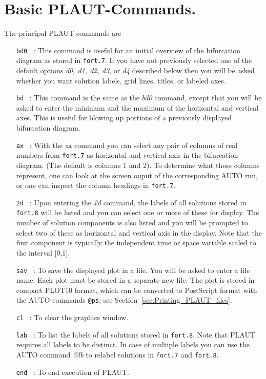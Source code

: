 \documentclass[12pt]{report}
\begin{document}
\section{ Basic {\cal PLAUT}-Commands.} \label{sec:main_PLAUT_commands}
The principal {\cal PLAUT}-commands are 
\begin{itemize}
\item[\tt bd0]~:
  This command is useful for an initial overview of the bifurcation
  diagram as stored in {\tt fort.7}.
  If you have not previously selected one of the default options 
  {\it d0, d1, d2, d3}, or {\it d4} described below then you will be asked
  whether you want solution labels, grid lines, titles, or labeled axes.

\item[\tt bd]~:
  This command is the same as the {\it bd0} command, except that you will be
  asked to enter the minimum and the maximum of the horizontal and 
  vertical axes.
  This is useful for blowing up portions of a previously displayed
  bifurcation diagram.

\item[\tt ax]~:
  With the {\it ax} command you can select any pair of columns of real
  numbers from {\tt fort.7} as horizontal and vertical axis in the
  bifurcation diagram. (The default is columns 1 and 2).
  To determine what these columns represent, one can look at the
  screen ouput of the corresponding {\cal AUTO} run, or one can inspect the
  column headings in {\tt fort.7}.
  
\item[\tt 2d]~:
  Upon entering the {\it 2d} command, the labels of all solutions stored 
  in {\tt fort.8} will be listed and you can select one or more of these 
  for display. The number of solution components is also listed
  and you will be prompted to select two of these as horizontal and
  vertical axis in the display.
  Note that the first component is typically the independent 
  time or space variable scaled to the interval [0,1].

\item[\tt sav]~:
  To save the displayed plot in a file. You will be asked to enter
  a file name. Each plot must be stored in a separate new file.
  The plot is stored in compact {\cal PLOT10} format, which can be converted to 
  {\cal PostScript} format with the {\cal AUTO}-commands {\tt @ps};
  see Section~\ref{sec:Printing_PLAUT_files}.

\item[\tt cl]~:  To clear the graphics window.

\item[\tt lab]~:
  To list the labels of all solutions stored in {\tt fort.8}.
  Note that {\cal PLAUT} requires all labels to be distinct.
  In case of multiple labels you can use the {\cal AUTO}
  command {\it @lb} to relabel solutions in
  {\tt fort.7} and {\tt fort.8}.

\item[\tt end]~:  To end execution of {\cal PLAUT}.
\end{itemize}
\end{document}
